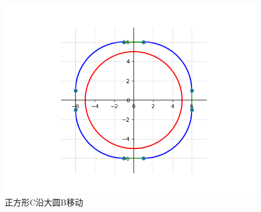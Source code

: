 \documentclass[UTF8]{ctexart}
\begin{document}
\begin{figure}[h!]
    \centering
    \includegraphics[width=0.8\linewidth]{coordinate_plane.png}
    \caption{正方形C沿大圆B移动}
    \label{fig:fig3}
\end{figure}
\end{document}
